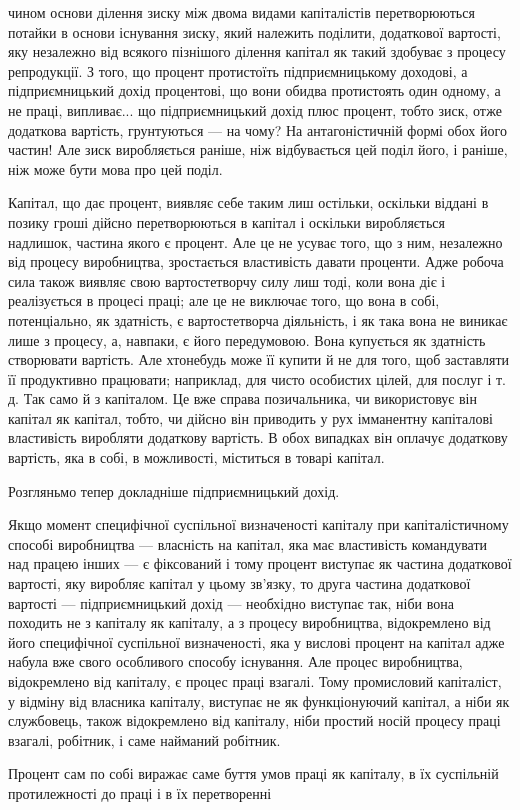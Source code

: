 чином основи ділення зиску між двома видами капіталістів перетворюються
потайки в основи існування зиску, який належить
поділити, додаткової вартості, яку незалежно від всякого пізнішого
ділення капітал як такий здобуває з процесу репродукції.
З того, що процент протистоїть підприємницькому доходові, а
підприємницький дохід процентові, що вони обидва протистоять
один одному, а не праці, випливає... що підприємницький дохід
плюс процент, тобто зиск, отже додаткова вартість, грунтуються
— на чому? На антагоністичній формі обох його частин!
Але зиск виробляється раніше, ніж відбувається цей поділ його,
і раніше, ніж може бути мова про цей поділ.

Капітал, що дає процент, виявляє себе таким лиш остільки,
оскільки віддані в позику гроші дійсно перетворюються в капітал
і оскільки виробляється надлишок, частина якого є процент.
Але це не усуває того, що з ним, незалежно від процесу виробництва,
зростається властивість давати проценти. Адже робоча
сила також виявляє свою вартостетворчу силу лиш тоді, коли
вона діє і реалізується в процесі праці; але це не виключає того,
що вона в собі, потенціально, як здатність, є вартостетворча
діяльність, і як така вона не виникає лише з процесу, а, навпаки,
є його передумовою. Вона купується як здатність створювати
вартість. Але хтонебудь може її купити й не для того, щоб заставляти
її продуктивно працювати; наприклад, для чисто особистих
цілей, для послуг і т. д. Так само й з капіталом. Це вже справа
позичальника, чи використовує він капітал як капітал, тобто,
чи дійсно він приводить у рух імманентну капіталові властивість
виробляти додаткову вартість. В обох випадках він оплачує
додаткову вартість, яка в собі, в можливості, міститься в товарі
капітал.

Розгляньмо тепер докладніше підприємницький дохід.

Якщо момент специфічної суспільної визначеності капіталу
при капіталістичному способі виробництва — власність на капітал,
яка має властивість командувати над працею інших — є фіксований
і тому процент виступає як частина додаткової вартості, яку
виробляє капітал у цьому зв’язку, то друга частина додаткової
вартості — підприємницький дохід — необхідно виступає так, ніби
вона походить не з капіталу як капіталу, а з процесу виробництва,
відокремлено від його специфічної суспільної визначеності,
яка у вислові процент на капітал адже набула вже
свого особливого способу існування. Але процес виробництва,
відокремлено від капіталу, є процес праці взагалі. Тому промисловий
капіталіст, у відміну від власника капіталу, виступає не
як функціонуючий капітал, а ніби як службовець, також відокремлено
від капіталу, ніби простий носій процесу праці взагалі,
робітник, і саме найманий робітник.

Процент сам по собі виражає саме буття умов праці як капіталу,
в їх суспільній протилежності до праці і в їх перетворенні
